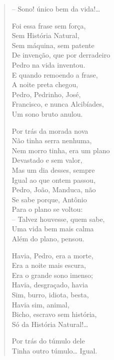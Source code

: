 \begin{verse}
-- Sono! único bem da vida!\ldots{}

Foi essa frase sem força,\\
Sem História Natural,\\
Sem máquina, sem patente\\
De invenção, que por derradeiro\\
Pedro na vida inventou.\\
E quando remoendo a frase,\\
A noite preta chegou,\\
Pedro, Pedrinho, José,\\
Francisco, e nunca Alcibíades,\\
Um sono bruto anulou.

Por trás da morada nova\\
Não tinha serra nenhuma,\\
Nem morro tinha, era um plano\\
Devastado e sem valor,\\
Mas um dia desses, sempre\\
Igual ao que ontem passou,\\
Pedro, João, Manduca, não\\
Se sabe porque, Antônio\\
Para o plano se voltou:\\
-- Talvez houvesse, quem sabe,\\
Uma vida bem mais calma\\
Além do plano, pensou.

Havia, Pedro, era a morte,\\
Era a noite mais escura,\\
Era o grande sono imenso;\\
Havia, desgraçado, havia\\
Sim, burro, idiota, besta,\\
Havia sim, animal,\\
Bicho, escravo sem história,\\
Só da História Natural!\ldots{}

Por trás do túmulo dele\\
Tinha outro túmulo\ldots{} Igual.
\end{verse}


\chapter*{}

